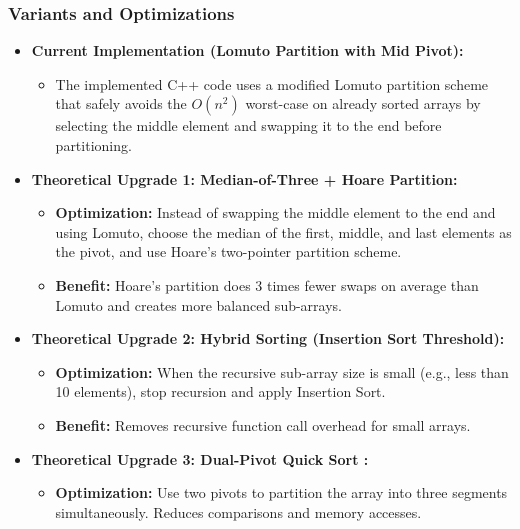    \subsubsection{Variants and Optimizations}
        \begin{itemize}
            \item \textbf{Current Implementation (Lomuto Partition with Mid Pivot):}
            \begin{itemize}
                \item The implemented C++ code uses a modified Lomuto partition scheme that safely avoids the $O(n^2)$ worst-case on already sorted arrays by selecting the middle element and swapping it to the end before partitioning.
            \end{itemize}
            \item \textbf{Theoretical Upgrade 1: Median-of-Three + Hoare Partition:}
            \begin{itemize}
                \item \textbf{Optimization:} Instead of swapping the middle element to the end and using Lomuto, choose the median of the first, middle, and last elements as the pivot, and use Hoare's two-pointer partition scheme.
                \item \textbf{Benefit:} Hoare's partition does 3 times fewer swaps on average than Lomuto and creates more balanced sub-arrays.
            \end{itemize}
            \item \textbf{Theoretical Upgrade 2: Hybrid Sorting (Insertion Sort Threshold):}
            \begin{itemize}
                \item \textbf{Optimization:} When the recursive sub-array size is small (e.g., less than 10 elements), stop recursion and apply Insertion Sort.
                \item \textbf{Benefit:} Removes recursive function call overhead for small arrays.
            \end{itemize}
            \item \textbf{Theoretical Upgrade 3: Dual-Pivot Quick Sort \cite{nebel2014pivot}:}
            \begin{itemize}
                \item \textbf{Optimization:} Use two pivots to partition the array into three segments simultaneously. Reduces comparisons and memory accesses.
            \end{itemize}
        \end{itemize}